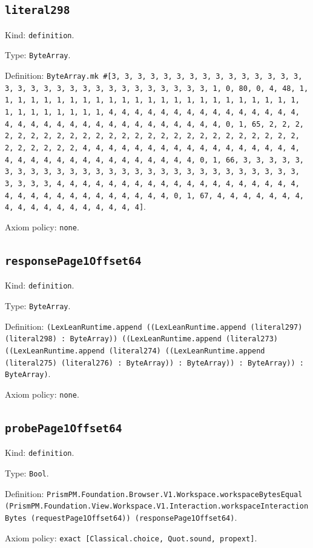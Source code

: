 \documentclass[11pt]{article}
\begin{document}
\subsection*{\texttt{literal298}}
\noindent Kind: \texttt{definition}.\par
\noindent Type: \texttt{ByteArray}.\par
\noindent Definition: \texttt{ByteArray.mk \#[3, 3, 3, 3, 3, 3, 3, 3, 3, 3, 3, 3, 3, 3, 3, 3, 3, 3, 3, 3, 3, 3, 3, 3, 3, 3, 3, 3, 3, 3, 3, 1, 0, 80, 0, 4, 48, 1, 1, 1, 1, 1, 1, 1, 1, 1, 1, 1, 1, 1, 1, 1, 1, 1, 1, 1, 1, 1, 1, 1, 1, 1, 1, 1, 1, 1, 1, 1, 1, 4, 4, 4, 4, 4, 4, 4, 4, 4, 4, 4, 4, 4, 4, 4, 4, 4, 4, 4, 4, 4, 4, 4, 4, 4, 4, 4, 4, 4, 4, 4, 4, 0, 1, 65, 2, 2, 2, 2, 2, 2, 2, 2, 2, 2, 2, 2, 2, 2, 2, 2, 2, 2, 2, 2, 2, 2, 2, 2, 2, 2, 2, 2, 2, 2, 2, 2, 4, 4, 4, 4, 4, 4, 4, 4, 4, 4, 4, 4, 4, 4, 4, 4, 4, 4, 4, 4, 4, 4, 4, 4, 4, 4, 4, 4, 4, 4, 4, 4, 0, 1, 66, 3, 3, 3, 3, 3, 3, 3, 3, 3, 3, 3, 3, 3, 3, 3, 3, 3, 3, 3, 3, 3, 3, 3, 3, 3, 3, 3, 3, 3, 3, 3, 3, 4, 4, 4, 4, 4, 4, 4, 4, 4, 4, 4, 4, 4, 4, 4, 4, 4, 4, 4, 4, 4, 4, 4, 4, 4, 4, 4, 4, 4, 4, 4, 4, 0, 1, 67, 4, 4, 4, 4, 4, 4, 4, 4, 4, 4, 4, 4, 4, 4, 4, 4, 4, 4]}.\par
\noindent Axiom policy: \texttt{none}.\par
\subsection*{\texttt{responsePage1Offset64}}
\noindent Kind: \texttt{definition}.\par
\noindent Type: \texttt{ByteArray}.\par
\noindent Definition: \texttt{(LexLeanRuntime.append ((LexLeanRuntime.append (literal297) (literal298) : ByteArray)) ((LexLeanRuntime.append (literal273) ((LexLeanRuntime.append (literal274) ((LexLeanRuntime.append (literal275) (literal276) : ByteArray)) : ByteArray)) : ByteArray)) : ByteArray)}.\par
\noindent Axiom policy: \texttt{none}.\par
\subsection*{\texttt{probePage1Offset64}}
\noindent Kind: \texttt{definition}.\par
\noindent Type: \texttt{Bool}.\par
\noindent Definition: \texttt{PrismPM.Foundation.Browser.V1.Workspace.workspaceBytesEqual (PrismPM.Foundation.View.Workspace.V1.Interaction.workspaceInteractionBytes (requestPage1Offset64)) (responsePage1Offset64)}.\par
\noindent Axiom policy: \texttt{exact [Classical.choice, Quot.sound, propext]}.\par
\end{document}
